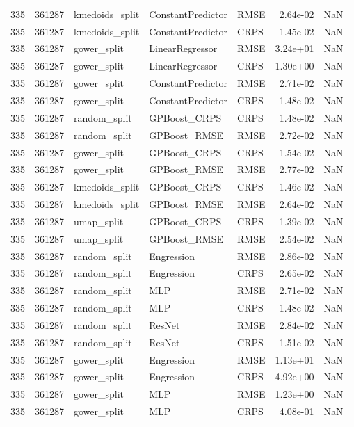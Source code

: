 \begin{tabular}{rrlllrr}
335 & 361287 & kmedoids\_split & ConstantPredictor & RMSE & 2.64e-02 & NaN \\
335 & 361287 & kmedoids\_split & ConstantPredictor & CRPS & 1.45e-02 & NaN \\
335 & 361287 & gower\_split & LinearRegressor & RMSE & 3.24e+01 & NaN \\
335 & 361287 & gower\_split & LinearRegressor & CRPS & 1.30e+00 & NaN \\
335 & 361287 & gower\_split & ConstantPredictor & RMSE & 2.71e-02 & NaN \\
335 & 361287 & gower\_split & ConstantPredictor & CRPS & 1.48e-02 & NaN \\
335 & 361287 & random\_split & GPBoost\_CRPS & CRPS & 1.48e-02 & NaN \\
335 & 361287 & random\_split & GPBoost\_RMSE & RMSE & 2.72e-02 & NaN \\
335 & 361287 & gower\_split & GPBoost\_CRPS & CRPS & 1.54e-02 & NaN \\
335 & 361287 & gower\_split & GPBoost\_RMSE & RMSE & 2.77e-02 & NaN \\
335 & 361287 & kmedoids\_split & GPBoost\_CRPS & CRPS & 1.46e-02 & NaN \\
335 & 361287 & kmedoids\_split & GPBoost\_RMSE & RMSE & 2.64e-02 & NaN \\
335 & 361287 & umap\_split & GPBoost\_CRPS & CRPS & 1.39e-02 & NaN \\
335 & 361287 & umap\_split & GPBoost\_RMSE & RMSE & 2.54e-02 & NaN \\
335 & 361287 & random\_split & Engression & RMSE & 2.86e-02 & NaN \\
335 & 361287 & random\_split & Engression & CRPS & 2.65e-02 & NaN \\
335 & 361287 & random\_split & MLP & RMSE & 2.71e-02 & NaN \\
335 & 361287 & random\_split & MLP & CRPS & 1.48e-02 & NaN \\
335 & 361287 & random\_split & ResNet & RMSE & 2.84e-02 & NaN \\
335 & 361287 & random\_split & ResNet & CRPS & 1.51e-02 & NaN \\
335 & 361287 & gower\_split & Engression & RMSE & 1.13e+01 & NaN \\
335 & 361287 & gower\_split & Engression & CRPS & 4.92e+00 & NaN \\
335 & 361287 & gower\_split & MLP & RMSE & 1.23e+00 & NaN \\
335 & 361287 & gower\_split & MLP & CRPS & 4.08e-01 & NaN \\

\end{tabular}
